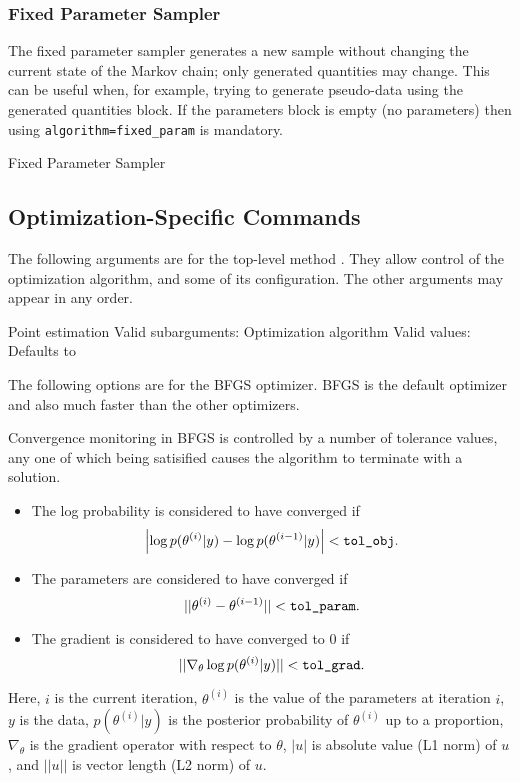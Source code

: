 \subsubsection{Fixed Parameter Sampler}

The fixed parameter sampler generates a new sample without changing
the current state of the Markov chain; only generated quantities may
change.  This can be useful when, for example, trying to generate pseudo-data 
using the generated quantities block. If the parameters block is empty (no parameters) then using {\tt algorithm=fixed\_param} is mandatory.
%
\begin{description}
        {Fixed Parameter Sampler}
\end{description}

\subsection{Optimization-Specific Commands}

The following arguments are for the top-level method .
They allow control of the optimization algorithm, and some of its
configuration.  The other arguments may appear in any order.

\begin{description}
%
    {Point estimation}
    {Valid subarguments: }
%
      {Optimization algorithm}
      {Valid values: \  }
      {Defaults to }
\end{description}
%
The following options are for the BFGS optimizer.  BFGS is the default
optimizer and also much faster than the other optimizers.  

Convergence monitoring in BFGS is controlled by a number of tolerance
values, any one of which being satisified causes the algorithm to
terminate with a solution.
%
\begin{itemize}
\item The log probability is considered to have converged if
\[
\left| \log p(\theta^{(i)}|y) - \log p(\theta^{(i-1)}|y) \right| <
\mbox{{\tt tol\_obj}}.
\]
\item The parameters are considered to have converged if
%
\\
\[
|| \theta^{(i)} - \theta^{(i-1)} || < \mbox{{\tt tol\_param}}.
\]
%
\item The gradient is considered to have converged to 0 if 
\[
|| \nabla_{\theta} \log p(\theta^{(i)}|y) || < \mbox{{\tt tol\_grad}}.
\]
\end{itemize}
%
Here, $i$ is the current iteration, $\theta^{(i)}$ is the value of the
parameters at iteration $i$, $y$ is the data, $p(\theta^{(i)}|y)$ is
the posterior probability of $\theta^{(i)}$ up to a proportion,
$\nabla_{\theta}$ is the gradient operator with respect to $\theta$,
$|u|$ is absolute value (L1 norm) of $u$, and $||u||$ is vector length
(L2 norm) of $u$.

